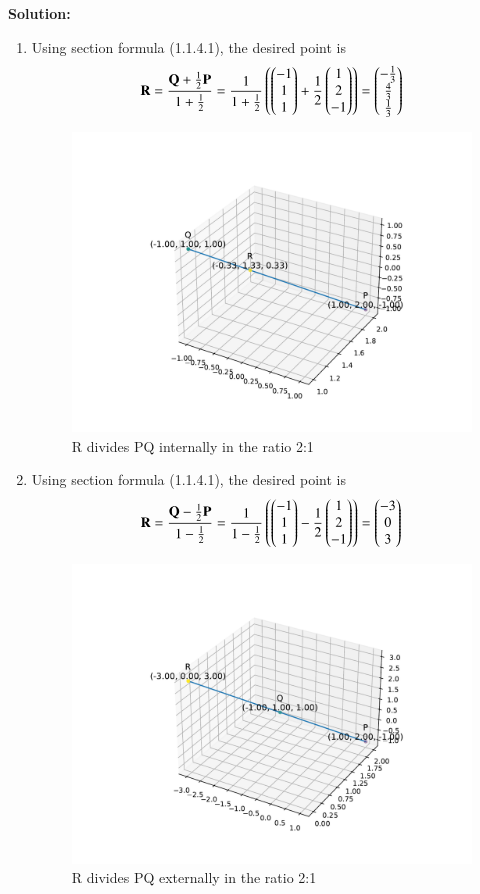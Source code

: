 \documentclass[journal]{IEEEtran}
\begin{document}
\textbf{Solution: } \\
\begin{enumerate}
	\item Using section formula (1.1.4.1), the desired point is 
		\begin{align}
			\mathbf{R} = \frac{\mathbf{Q} + \frac{1}{2}\mathbf{P}}{1 + \frac{1}{2}} = \frac{1}{1 + \frac{1}{2}}\left(\begin{pmatrix}-1 \\ 1 \\ 1\end{pmatrix} + \frac{1}{2}\begin{pmatrix}1 \\ 2 \\ -1\end{pmatrix}\right) = \begin{pmatrix}-\frac{1}{3} \\ \frac{4}{3} \\ \frac{1}{3}\end{pmatrix}	
		\end{align}
		\begin{figure}[h!]
			\centering
			\includegraphics[width=0.7\linewidth]{figs/fig1.pdf}
			\caption{R divides PQ internally in the ratio 2:1}
		\end{figure}
	\item Using section formula (1.1.4.1), the desired point is 
		\begin{align}
			\mathbf{R} = \frac{\mathbf{Q} - \frac{1}{2}\mathbf{P}}{1 - \frac{1}{2}} = \frac {1}{1 - \frac{1}{2}} \left(\begin{pmatrix}-1 \\ 1 \\ 1\end{pmatrix} - \frac{1}{2}\begin{pmatrix}1 \\ 2 \\ -1\end{pmatrix}\right) = \begin{pmatrix}-3 \\ 0 \\ 3\end{pmatrix}
		\end{align}
		\begin{figure}[h!]
			\centering
			\includegraphics[width=0.7\linewidth]{figs/fig2.pdf}
			\caption{R divides PQ externally in the ratio 2:1}
		\end{figure}
\end{enumerate}
\end{document}
